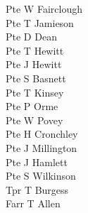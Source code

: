 \begin{multicols}{2}
  Pte W Fairclough \\
  Pte T Jamieson \\
  Pte D Dean \\
  Pte T Hewitt \\
  Pte J Hewitt \\
  Pte S Basnett \\
  Pte T Kinsey \\
  Pte P Orme \\
  Pte W Povey \\
  Pte H Cronchley \\
  Pte J Millington \\
  Pte J Hamlett \\
  Pte S Wilkinson \\
  Tpr T Burgess \\
  Farr T Allen \\
\end{multicols}
